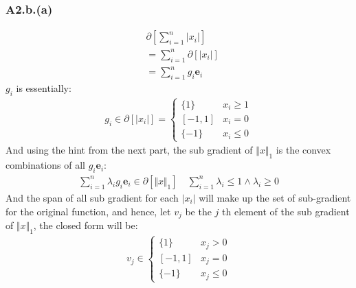 \documentclass[]{article}
\begin{document}
        \subsubsection*{A2.b.(a)}
            \begin{align*}\tag{a2.b.a.1}\label{eqn:a2.b.a.1}
                & \partial\left[\sum_{i = 1}^{n} |x_i|\right] 
                \\
                &= \sum_{i = 1}^{n} \partial[|x_i|]
                \\
                &= \sum_{i = 1}^{n} g_i\mathbf{e}_i 
            \end{align*}
            $g_i$ is essentially: 
            \begin{align*}\tag{a2.b.a.2}\label{eqn:a2.b.a.2}
                g_i \in \partial[|x_i|] = \begin{cases}
                    \{1\} & x_i \ge 1
                    \\
                    [-1, 1] & x_i = 0
                    \\
                    \{-1\} & x_i \le 0
                \end{cases}                
            \end{align*}
            And using the hint from the next part, the sub gradient of $\Vert x\Vert_1$ is the convex combinations of all $g_i\mathbf{e}_i$: 
            \begin{align*}\tag{a2.b.a.3}\label{eqn:a2.b.a.3}
                \sum_{i = 1}^{n}\lambda_i g_i\mathbf{e}_i \in \partial[\Vert x\Vert_1] \quad 
                \sum_{i=1}^{n}\lambda_i \le 1 \wedge \lambda_i \ge 0
            \end{align*}
            And the span of all sub gradient for each $|x_i|$ will make up the set of sub-gradient for the original function, and hence, let $v_j$ be the $j$ th element of the sub gradient of $\Vert x\Vert_1$, the closed form will be: 
            \begin{align*}\tag{A2.b.1.3}\label{eqn:A2.b.1.3}
                v_j \in \begin{cases}
                    \{1\} & x_j > 0 
                    \\
                    [-1 ,1] & x_j = 0
                    \\
                    \{-1\} & x_j \le 0
                \end{cases}
            \end{align*}
\end{document}
